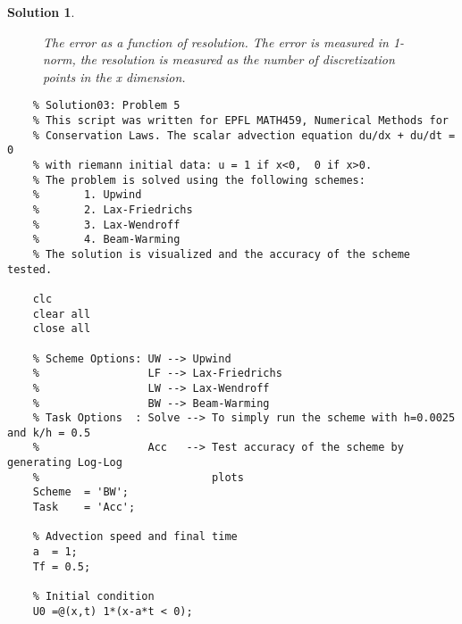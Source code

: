 \documentclass[10pt,letterpaper]{article}
\theoremstyle{break}
\newtheorem{mysolution}{Solution}
\newenvironment{solution}{\begin{mysolution}}{\end{mysolution}}
\begin{document}
\begin{solution}
    
    
    \begin{figure}[H] 
    \begin{center}
    \caption{ The error as a function of resolution. The error is measured in 1-norm, the resolution is measured as the number of discretization points in the x dimension. }
    \end{center}
    \end{figure}
    
    
    
    
    \newpage
    
    
    
    \begin{lstlisting}
    % Solution03: Problem 5
    % This script was written for EPFL MATH459, Numerical Methods for
    % Conservation Laws. The scalar advection equation du/dx + du/dt = 0
    % with riemann initial data: u = 1 if x<0,  0 if x>0.
    % The problem is solved using the following schemes:
    %       1. Upwind
    %       2. Lax-Friedrichs
    %       3. Lax-Wendroff
    %       4. Beam-Warming
    % The solution is visualized and the accuracy of the scheme tested.
    
    clc
    clear all
    close all
    
    % Scheme Options: UW --> Upwind
    %                 LF --> Lax-Friedrichs
    %                 LW --> Lax-Wendroff
    %                 BW --> Beam-Warming
    % Task Options  : Solve --> To simply run the scheme with h=0.0025 and k/h = 0.5
    %                 Acc   --> Test accuracy of the scheme by generating Log-Log
    %                           plots
    Scheme 	= 'BW';
    Task 	= 'Acc';
    
    % Advection speed and final time
    a  = 1;
    Tf = 0.5;
    
    % Initial condition
    U0 =@(x,t) 1*(x-a*t < 0);
    

\end{lstlisting}
\end{solution}
\end{document}
